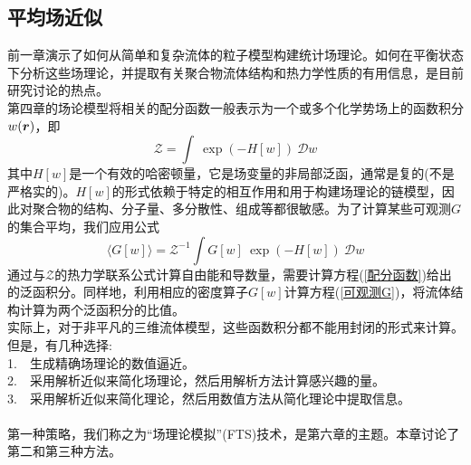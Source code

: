 \subsection{平均场近似}
前一章演示了如何从简单和复杂流体的粒子模型构建统计场理论。如何在平衡状态下分析这些场理论，并提取有关聚合物流体结构和热力学性质的有用信息，是目前研究讨论的热点。\\

第四章的场论模型将相关的配分函数一般表示为一个或多个化学势场上的函数积分$w(\bm{r})$，即\\
\begin{equation}
	\mathcal{Z}=\int  \ \exp(-H[w])\ \mathcal{D}w \label{配分函数}
\end{equation}
其中$H[w]$是一个有效的哈密顿量，它是场变量的非局部泛函，通常是复的(不是严格实的)。$H[w]$的形式依赖于特定的相互作用和用于构建场理论的链模型，因此对聚合物的结构、分子量、多分散性、组成等都很敏感。为了计算某些可观测$G$的集合平均，我们应用公式\\
\begin{equation}
	\langle G[w]\rangle = \mathcal{Z}^{-1}\int  G[w]\ \exp(-H[w])\ \mathcal{D}w \label{可观测G}
\end{equation}
通过与$\mathcal{Z}$的热力学联系公式计算自由能和导数量，需要计算方程(\ref{配分函数})给出的泛函积分。同样地，利用相应的密度算子$G[w]$计算方程(\ref{可观测G})，将流体结构计算为两个泛函积分的比值。\\

实际上，对于非平凡的三维流体模型，这些函数积分都不能用封闭的形式来计算。但是，有几种选择:\\

1.\ \ 生成精确场理论的数值逼近。\\

2.\ \ 采用解析近似来简化场理论，然后用解析方法计算感兴趣的量。\\

3.\ \ 采用解析近似来简化理论，然后用数值方法从简化理论中提取信息。\\
\\
第一种策略，我们称之为“场理论模拟”(FTS)技术，是第六章的主题。本章讨论了第二和第三种方法。\\
